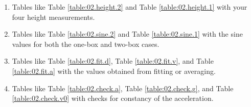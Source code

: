 \begin{enumerate}
    \item Tables like Table \ref{table:02.height.2} and Table \ref{table:02.height.1} with your four height measurements.
    \item Tables like Table \ref{table:02.sine.2} and Table \ref{table:02.sine.1} with the sine values for both the one-box and two-box cases.
    \item Tables like Table \ref{table:02.fit.d}, Table \ref{table:02.fit.v}, and Table \ref{table:02.fit.a} with the values obtained from fitting or averaging.
    \item Tables like Table \ref{table:02.check.a}, Table \ref{table:02.check.g}, and Table \ref{table:02.check.v0} with checks for constancy of the acceleration.
\end{enumerate}
\newpage
